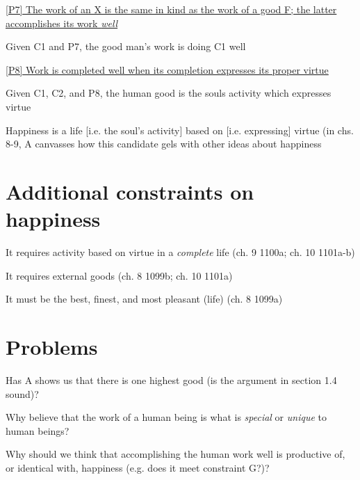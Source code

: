 \documentclass[11pt]{article}
\begin{document}
\noindent\underline{[P7] The work of an X is the same in kind as the work of a good F; the latter accomplishes its work \emph{well}}
\vspace*{1mm}

\noindent [C2] Given C1 and P7, the good man's work is doing C1 well
\vspace*{3mm}

\noindent \underline{[P8] Work is completed well when its completion expresses its proper virtue}
\vspace*{1mm}

\noindent [C3] Given C1, C2, and P8, the human good is the souls activity which expresses virtue
\vspace*{2mm}

\noindent Happiness is a life [i.e. the soul's activity] based on [i.e. expressing] virtue (in chs. 8-9, A canvasses how this candidate gels with other ideas about happiness

\section*{Additional constraints on happiness}

\noindent [E] It requires activity based on virtue in a \emph{complete} life (ch. 9 1100a; ch. 10 1101a-b)
\vspace*{2mm}

\noindent [F] It requires external goods (ch. 8 1099b; ch. 10 1101a)
\vspace*{2mm}

\noindent [G] It must be the best, finest, and most pleasant (life) (ch. 8 1099a)

\section*{Problems}

\noindent [1] Has A shows us that there is one highest good (is the argument in section 1.4 sound)?
\vspace*{2mm}

\noindent [2] Why believe that the work of a human being is what is \emph{special} or \emph{unique} to human beings?
\vspace*{2mm}

\noindent [3] Why should we think that accomplishing the human work well is productive of, or identical with, happiness (e.g. does it meet constraint G?)?
\end{document}
